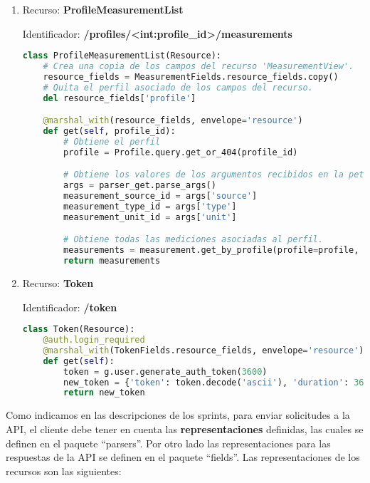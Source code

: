 \begin{enumerate}
\begin{lstlisting}[language=Python]
        # Obtiene las ultimas mediciones asociadas al perfil.
        latest_measurements = measurement.get_latest_by_profile(profile)
        return latest_measurements
\end{lstlisting}

\item Recurso: \textbf{ProfileMeasurementList}

Identificador: \textbf{/profiles/<int:profile\_id>/measurements}

\begin{lstlisting}[language=Python]
class ProfileMeasurementList(Resource):
    # Crea una copia de los campos del recurso 'MeasurementView'.
    resource_fields = MeasurementFields.resource_fields.copy()
    # Quita el perfil asociado de los campos del recurso.
    del resource_fields['profile']

    @marshal_with(resource_fields, envelope='resource')
    def get(self, profile_id):
        # Obtiene el perfil
        profile = Profile.query.get_or_404(profile_id)

        # Obtiene los valores de los argumentos recibidos en la peticion.
        args = parser_get.parse_args()
        measurement_source_id = args['source']
        measurement_type_id = args['type']
        measurement_unit_id = args['unit']

        # Obtiene todas las mediciones asociadas al perfil.
        measurements = measurement.get_by_profile(profile=profile, source_id=measurement_source_id, type_id=measurement_type_id, unit_id=measurement_unit_id)
        return measurements
\end{lstlisting}

\item Recurso: \textbf{Token}

Identificador: \textbf{/token}

\begin{lstlisting}[language=Python]
class Token(Resource):
    @auth.login_required
    @marshal_with(TokenFields.resource_fields, envelope='resource')
    def get(self):
        token = g.user.generate_auth_token(3600)
        new_token = {'token': token.decode('ascii'), 'duration': 3600}
        return new_token
\end{lstlisting}

\end{enumerate}

Como indicamos en las descripciones de los sprints, para enviar solicitudes a la API, el cliente debe tener en cuenta las \textbf{representaciones} definidas, las cuales se definen en el paquete ``parsers''. Por otro lado las representaciones para las respuestas de la API se definen en el paquete ``fields''. Las representaciones de los recursos son las siguientes:

